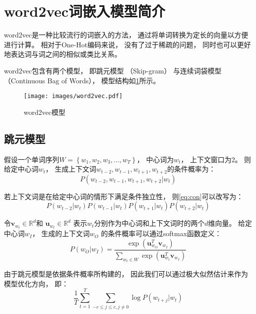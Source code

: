 \section{word2vec词嵌入模型简介}

word2vec是一种比较流行的词嵌入的方法，
通过将单词转换为定长的向量以方便进行计算。
相对于One-Hot编码来说，
没有了过于稀疏的问题，
同时也可以更好地表达词与词之间的相似或类比关系。

word2vec包含有两个模型，
即跳元模型\cite{mikolovDistributedRepresentationsWords2013}
（Skip-gram）
与连续词袋模型\cite{mikolovEfficientEstimationWord2013}
（Continuous Bag of Words），
模型结构如\cref{fig:word2vec}所示。

\begin{figure}[!htbp]
    \centering
    \texttt{[image: images/word2vec.pdf]}
    \caption{word2vec模型}\label{fig:word2vec}
\end{figure}

\subsection{跳元模型}

假设一个单词序列$W = \left\{w_1, w_2, w_3, \ldots, w_T\right\}$，
中心词为$w_t$，
上下文窗口为$2$。
则给定中心词$w_t$，
生成上下文词$w_{t-2}, w_{t-1}, w_{t+1}, w_{t+2}$的条件概率为：
\begin{equation}
    \label{eq:con}
    P(w_{t-2}, w_{t-1}, w_{t+1}, w_{t+2}|w_t)
\end{equation}

若上下文词是在给定中心词的情形下满足条件独立性，
则\cref{eq:con}可以改写为：
\begin{equation}
    P(w_{t-2}|w_t)P(w_{t-1}|w_t)P(w_{t+1}|w_t)P(w_{t+2}|w_t)
\end{equation}

令$\mathbf{v}_{w_t}\in\mathbb{R}^d$和
$\mathbf{u}_{w_t}\in\mathbb{R}^d$
表示$w_t$分别作为中心词和上下文词时的两个$d$维向量。
给定中心词$w_I$，
生成的上下文词$w_O$
的条件概率可以通过softmax函数定义：
\begin{equation}
    P\left(w_O|w_I\right) = \frac{\exp\left(\mathbf{u}_{w_O}^T\mathbf{v}_{w_I}\right)}{\sum_{w_t\in W}\exp\left(\mathbf{u}_{w_t}^T\mathbf{v}_{w_I}\right)}
\end{equation}

由于跳元模型是依据条件概率所构建的，
因此我们可以通过极大似然估计来作为模型优化方向，
即：
\begin{equation}
    \frac{1}{T}\sum^T_{t=1}\sum_{-c\leqslant j\leqslant c, j\neq 0}\log P\left(w_{t+j}|w_t\right)
\end{equation}

